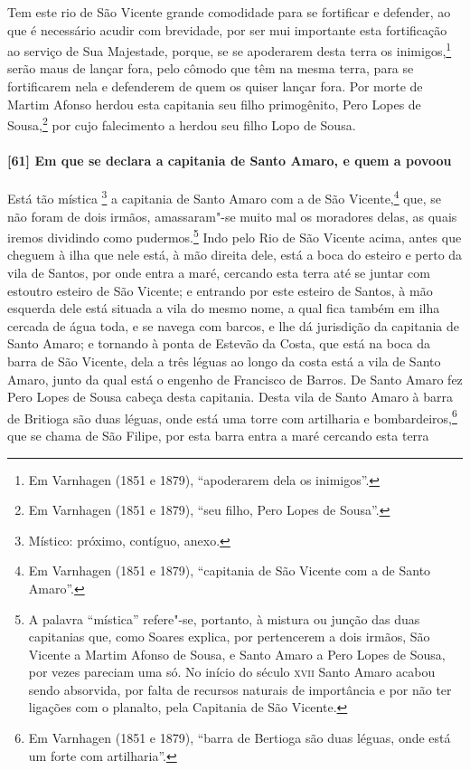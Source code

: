 Tem este rio de São Vicente grande comodidade para se fortificar e defender, ao que é
necessário acudir com brevidade, por ser mui importante esta fortificação ao serviço de
Sua Majestade, porque, se se apoderarem desta terra os inimigos,\footnote{ Em Varnhagen
(1851 e 1879), ``apoderarem dela os inimigos''.} serão maus de lançar fora, pelo cômodo
que têm na mesma terra, para se fortificarem nela e defenderem de quem os quiser lançar
fora. Por morte de Martim Afonso herdou esta capitania seu filho primogênito, Pero Lopes
de Sousa,\footnote{ Em Varnhagen (1851 e 1879), ``seu filho, Pero Lopes de Sousa''.} por
cujo falecimento a herdou seu filho Lopo de Sousa.

\paragraph{[61] Em que se declara a capitania de Santo Amaro, e quem a povoou} \quad
Está tão mística \footnote{ Místico: próximo, contíguo, anexo.} a capitania de Santo Amaro
com a de São Vicente,\footnote{ Em Varnhagen (1851 e 1879), ``capitania de São Vicente com
a de Santo Amaro''.} que, se não foram de dois irmãos, amassaram"-se muito mal os moradores
delas, as quais iremos dividindo como pudermos.\footnote{ A palavra ``mística'' refere"-se,
portanto, à mistura ou junção das duas capitanias que, como Soares explica, por
pertencerem a dois irmãos, São Vicente a Martim Afonso de Sousa, e Santo Amaro a Pero Lopes
de Sousa, por vezes pareciam uma só. No início do século \textsc{xvii} Santo Amaro acabou
sendo absorvida, por falta de recursos naturais de importância e por não ter ligações com
o planalto, pela Capitania de São Vicente.} Indo pelo Rio de São Vicente acima, antes que
cheguem à ilha que nele está, à mão direita dele, está a boca do esteiro e perto da vila
de Santos, por onde entra a maré, cercando esta terra até se juntar com estoutro esteiro
de São Vicente; e entrando por este esteiro de Santos, à mão esquerda dele está situada a
vila do mesmo nome, a qual fica também em ilha cercada de água toda, e se navega com
barcos, e lhe dá jurisdição da capitania de Santo Amaro; e tornando à ponta de Estevão da
Costa, que está na boca da barra de São Vicente, dela a três léguas ao longo da costa está
a vila de Santo Amaro, junto da qual está o engenho de Francisco de Barros. De Santo Amaro
fez Pero Lopes de Sousa cabeça desta capitania. Desta vila de Santo Amaro à barra de
Britioga são duas léguas, onde está uma torre com artilharia e bombardeiros,\footnote{ Em
Varnhagen (1851 e 1879), ``barra de Bertioga são duas léguas, onde está um forte com
artilharia''.} que se chama de São Filipe, por esta barra entra a maré cercando esta terra
